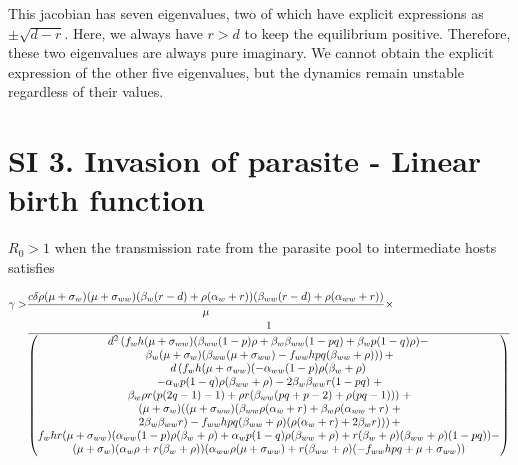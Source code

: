 \documentclass[11pt]{article}
\begin{document}
This jacobian has seven eigenvalues, two of which have explicit expressions as $\pm \sqrt{d - r}$. 
Here, we always have $r > d$ to keep the equilibrium positive. 
Therefore, these two eigenvalues are always pure imaginary. 
We cannot obtain the explicit expression of the other five eigenvalues, but the dynamics remain unstable regardless of their values.

\section*{SI 3. Invasion of parasite - Linear birth function }


$R_0 > 1$ when the transmission rate from the parasite pool to intermediate hosts satisfies

\begin{align}
	\gamma > & \frac{c \delta  \rho  (\mu +\sigma_w) (\mu + \sigma_{ww}) (\beta_w (r-d)+\rho  (\alpha_w+ r)) (\beta_{ww} (r-d)+\rho  (\alpha_{ww}+r))}{\mu } \notag \times \\
	& \frac{1}{\begin{pmatrix}
			d^2 \left(f_w h (\mu  + \sigma_{ww}) (\beta_{ww} (1-p) \rho  + \beta_w \beta_{ww} (1-p q)+\beta_w p (1-q) \rho ) - \right. \\
			\left. \beta_w (\mu + \sigma_w) (\beta_{ww} (\mu +\sigma_{ww}) - f_{ww} h p q (\beta_{ww}+\rho ))\right) + \\
			d \left(f_w h (\mu +\sigma_{ww}) (- \alpha_{ww} (1-p) \rho  (\beta_w + \rho )  \right.  \\
			\left. - \alpha_w p (1 - q) \rho  (\beta_{ww}+\rho ) - 2 \beta_w \beta_{ww} r (1-p q) \right. + \\
			\left. \beta_w \rho  r (p (2 q-1)-1) + \rho  r (\beta_{ww} (p q + p-2)+\rho  (p q - 1))) \right. + \\
			\left. (\mu +\sigma_w) ((\mu +\sigma_{ww}) (\beta_{ww} \rho  (\alpha_w+r) + \beta_w \rho  (\alpha_{ww}+r) \right. + \\
			\left. 2 \beta_w \beta_{ww} r)-f_{ww} h p q (\beta_{ww}+\rho ) (\rho  (\alpha_w+r)+2 \beta_w r)) \right) + \\
			f_w h r (\mu +\sigma_{ww}) (\alpha_{ww} (1-p) \rho  (\beta_w+\rho )+\alpha_w p (1-q) \rho  (\beta_{ww}+\rho )+r (\beta_w+\rho ) (\beta_{ww}+\rho ) (1-p q)) - \\
			(\mu +\sigma_w) (\alpha_w \rho +r (\beta_w+\rho )) (\alpha_{ww} \rho  (\mu +\sigma_{ww})+r (\beta_{ww}+\rho ) (-f_{ww} h p q+\mu +\sigma_{ww}))
		\end{pmatrix}}
\end{align}
\end{document}
